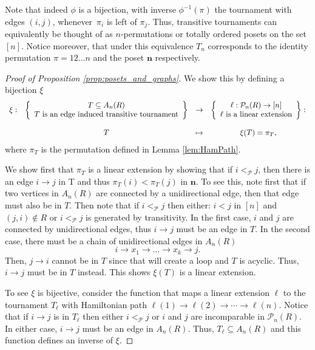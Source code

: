 \documentclass[9pt,a4paper,oneside]{article}
\newcommand{\cP}{\mathcal{P}}
\newcommand{\bn}{\mathbf{n}}
\begin{document}
Note that indeed $\phi$ is a bijection, with inverse $\phi^{-1}(\pi)$ the tournament with edges $(i,j)$, whenever~$\pi_i$ is left of $\pi_j$. Thus, transitive tournaments can equivalently  be thought of as $n$-permutations or totally ordered posets on the set $[n]$.
Notice moreover, that under this equivalence $T_n$ corresponds to the identity permutation $\pi = 12\ldots n$ and the poset $\bn$ respectively.
 
 
\begin{proof}[Proof of Proposition \ref{prop:posets_and_graphs}]

We show this by defining a bijection $\xi$ 
\[\begin{array}{c c c c}
\xi: & \left\{  \begin{array}{c}
						T \subseteq A_n(R)\\
						T \text{ is an edge induced transitive tournament} 
						\end{array}
		\right\}							
		& \to 			& 
		\left\{  \begin{array}{c}
						\ell:\cP_n(R)\to [n]\\
						\ell \text{ is a linear extension} 
						\end{array}
		\right\}:						 \\
						&&&\\
        & T & \mapsto 	& \xi(T) = \pi_T,
\end{array}\]
where $\pi_T$ is the permutation defined in Lemma \ref{lem:HamPath}.

We show first that $\pi_T$ is a linear extension by showing that if $i<_{\cP}j$, then there is an edge $i\to j$ in T and thus $\pi_T(i)< \pi_T(j)$ in $\bn$.
To see this, note first that if two vertices in $A_n(R)$ are connected by a unidirectional edge, then that edge must also be in $T$. %
Then note that if $i<_{\cP}j$ then either: $i<j$ in $[n]$ and $(j,i)\notin R$ or $i<_{\cP}j$ is generated by transitivity.  In the first case, $i$ and $j$ are connected by unidirectional edges, thus $i\to j$ must be an edge in $T$.
In the second case, there must be a chain of unidirectional edges in $A_n(R)$ 
\[i\to x_1 \to \ldots \to x_k \to j.\]
Then, $j\to i$ cannot be in $T$ since that will create a loop and $T$ is acyclic. Thus, $i\to j$ must be in $T$ instead. This shows $\xi(T)$ is a linear extension.
 
To see $\xi$  is bijective, consider the function that maps a linear extension $\ell$ to the tournament $T_\ell$ with Hamiltonian path $\ell(1) \to \ell(2) \to \cdots \to \ell(n)$.
Notice that if $i\to j$ is in $T_\ell$ then either $i<_\cP j$ or $i$ and $j$ are incomparable in $\cP_n(R)$.
In either case, $i\to j$ must be an edge in $A_n(R)$.  Thus, $T_\ell \subseteq A_n(R)$ and this function defines an inverse of $\xi$.  
\end{proof}
 
\end{document}
